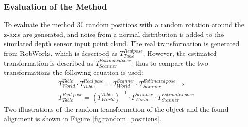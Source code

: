 \documentclass[../main.tex]{subfiles}
\begin{document}
\subsubsection{Evaluation of the Method} \label{subsubsec:eval_method2}
To evaluate the method 30 random positions with a random rotation around the z-axis are generated, and noise from a normal distribution is added to the simulated depth sensor input point cloud. The real transformation is generated from RobWorks, which is described as $T_{Table}^{Real pose}$. However, the estimated transformation is described as $T_{Scanner}^{Estimated pose}$, thus to compare the two transformations the following equation is used: 
\begin{equation}
\begin{split}
    T_{World}^{Table} \cdot T_{Table}^{Real\ pose} = T_{World}^{Scanner} \cdot T_{Scanner}^{Estimated\ pose} \Rightarrow \\
    T_{Table}^{Real\ pose} = \left ( T_{World}^{Table} \right )^{-1} \cdot T_{World}^{Scanner} \cdot T_{Scanner}^{Estimated\ pose}
\end{split}
\end{equation}
Two illustrations of the random transformation of the object and the found alignment is shown in Figure \ref{fig:random_positions}.
\end{document}
